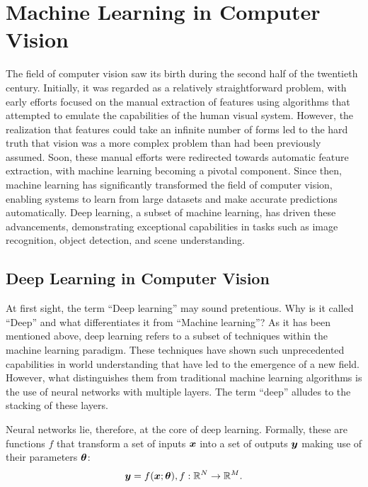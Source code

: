 
\section{Machine Learning in Computer Vision}\label{sec:ml}

The field of computer vision saw its birth during the second half of the twentieth century. Initially, it was regarded as a relatively straightforward problem, with early efforts focused on the manual extraction of features using algorithms that attempted to emulate the capabilities of the human visual system. However, the realization that features could take an infinite number of forms led to the hard truth that vision was a more complex problem than had been previously assumed. Soon, these manual efforts were redirected towards automatic feature extraction, with machine learning becoming a pivotal component. Since then, machine learning has significantly transformed the field of computer vision, enabling systems to learn from large datasets and make accurate predictions automatically. Deep learning, a subset of machine learning, has driven these advancements, demonstrating exceptional capabilities in tasks such as image recognition, object detection, and scene understanding. 

\subsection{Deep Learning in Computer Vision}
\label{subsec:deep_learning}
At first sight, the term ``Deep learning'' may sound pretentious. Why is it called ``Deep'' and what differentiates it from ``Machine learning''?  As it has been mentioned above, deep learning refers to a subset of techniques within the machine learning paradigm. These techniques have shown such unprecedented capabilities in world understanding that have led to the emergence of a new field. However, what distinguishes them from traditional machine learning algorithms is the use of neural networks with multiple layers. The term ``deep'' alludes to the stacking of these layers.

Neural networks lie, therefore, at the core of deep learning. Formally, these are functions $f$ that transform a set of inputs $\boldsymbol{x}$ into a set of outputs $\boldsymbol{y}$ making use of their parameters $\boldsymbol{\theta}$: 
\begin{equation*}
    \boldsymbol{y} = f(\boldsymbol{x};\boldsymbol{\theta}), f: \mathbb{R}^N \rightarrow \mathbb{R}^M.
\end{equation*}

